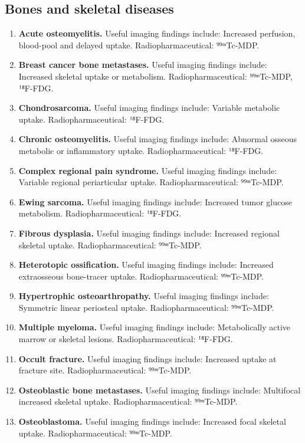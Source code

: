 \subsection{Bones and skeletal diseases}
\begin{enumerate}[leftmargin=*,itemsep=0.45em,topsep=0.4em]
\item \textbf{Acute osteomyelitis.} Useful imaging findings include: Increased perfusion, blood-pool and delayed uptake. Radiopharmaceutical: ⁹⁹ᵐTc-MDP.
\item \textbf{Breast cancer bone metastases.} Useful imaging findings include: Increased skeletal uptake or metabolism. Radiopharmaceutical: ⁹⁹ᵐTc-MDP, ¹⁸F-FDG.
\item \textbf{Chondrosarcoma.} Useful imaging findings include: Variable metabolic uptake. Radiopharmaceutical: ¹⁸F-FDG.
\item \textbf{Chronic osteomyelitis.} Useful imaging findings include: Abnormal osseous metabolic or inflammatory uptake. Radiopharmaceutical: ¹⁸F-FDG.
\item \textbf{Complex regional pain syndrome.} Useful imaging findings include: Variable regional periarticular uptake. Radiopharmaceutical: ⁹⁹ᵐTc-MDP.
\item \textbf{Ewing sarcoma.} Useful imaging findings include: Increased tumor glucose metabolism. Radiopharmaceutical: ¹⁸F-FDG.
\item \textbf{Fibrous dysplasia.} Useful imaging findings include: Increased regional skeletal uptake. Radiopharmaceutical: ⁹⁹ᵐTc-MDP.
\item \textbf{Heterotopic ossification.} Useful imaging findings include: Increased extraosseous bone-tracer uptake. Radiopharmaceutical: ⁹⁹ᵐTc-MDP.
\item \textbf{Hypertrophic osteoarthropathy.} Useful imaging findings include: Symmetric linear periosteal uptake. Radiopharmaceutical: ⁹⁹ᵐTc-MDP.
\item \textbf{Multiple myeloma.} Useful imaging findings include: Metabolically active marrow or skeletal lesions. Radiopharmaceutical: ¹⁸F-FDG.
\item \textbf{Occult fracture.} Useful imaging findings include: Increased uptake at fracture site. Radiopharmaceutical: ⁹⁹ᵐTc-MDP.
\item \textbf{Osteoblastic bone metastases.} Useful imaging findings include: Multifocal increased skeletal uptake. Radiopharmaceutical: ⁹⁹ᵐTc-MDP.
\item \textbf{Osteoblastoma.} Useful imaging findings include: Increased focal skeletal uptake. Radiopharmaceutical: ⁹⁹ᵐTc-MDP.

\end{enumerate}
